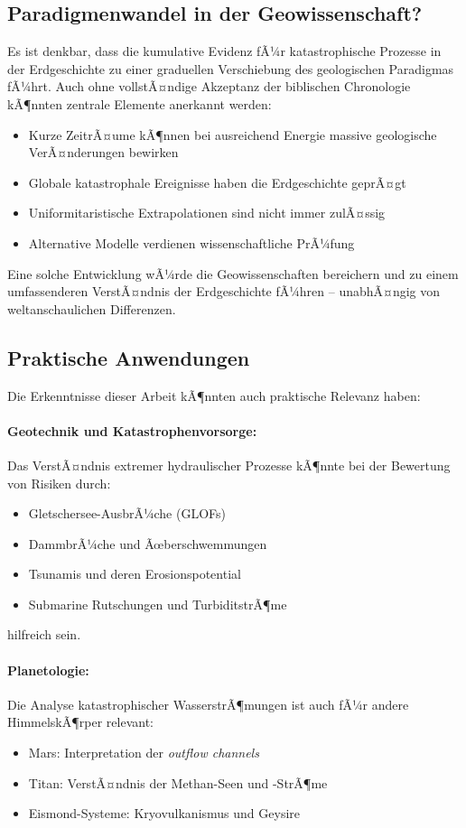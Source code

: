 ﻿\documentclass[12pt,a4paper]{report}
\begin{document}
\subsection{Paradigmenwandel in der Geowissenschaft?}

Es ist denkbar, dass die kumulative Evidenz fÃ¼r katastrophische Prozesse in der Erdgeschichte zu einer graduellen Verschiebung des geologischen Paradigmas fÃ¼hrt. Auch ohne vollstÃ¤ndige Akzeptanz der biblischen Chronologie kÃ¶nnten zentrale Elemente anerkannt werden:

\begin{itemize}
	\item Kurze ZeitrÃ¤ume kÃ¶nnen bei ausreichend Energie massive geologische VerÃ¤nderungen bewirken
	\item Globale katastrophale Ereignisse haben die Erdgeschichte geprÃ¤gt
	\item Uniformitaristische Extrapolationen sind nicht immer zulÃ¤ssig
	\item Alternative Modelle verdienen wissenschaftliche PrÃ¼fung
\end{itemize}

Eine solche Entwicklung wÃ¼rde die Geowissenschaften bereichern und zu einem umfassenderen VerstÃ¤ndnis der Erdgeschichte fÃ¼hren -- unabhÃ¤ngig von weltanschaulichen Differenzen.

\subsection{Praktische Anwendungen}

Die Erkenntnisse dieser Arbeit kÃ¶nnten auch praktische Relevanz haben:

\paragraph{Geotechnik und Katastrophenvorsorge:}
Das VerstÃ¤ndnis extremer hydraulischer Prozesse kÃ¶nnte bei der Bewertung von Risiken durch:
\begin{itemize}
	\item Gletschersee-AusbrÃ¼che (GLOFs)
	\item DammbrÃ¼che und Ãœberschwemmungen
	\item Tsunamis und deren Erosionspotential
	\item Submarine Rutschungen und TurbiditstrÃ¶me
\end{itemize}
hilfreich sein.

\paragraph{Planetologie:}
Die Analyse katastrophischer WasserstrÃ¶mungen ist auch fÃ¼r andere HimmelskÃ¶rper relevant:
\begin{itemize}
	\item Mars: Interpretation der \textit{outflow channels}
	\item Titan: VerstÃ¤ndnis der Methan-Seen und -StrÃ¶me
	\item Eismond-Systeme: Kryovulkanismus und Geysire
\end{itemize}
\end{document}
